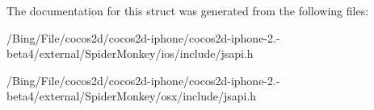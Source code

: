 The documentation for this struct was generated from the following files\-:\begin{DoxyCompactItemize}
\item 
/\-Bing/\-File/cocos2d/cocos2d-\/iphone/cocos2d-\/iphone-\/2.-\/beta4/external/\-Spider\-Monkey/ios/include/jsapi.\-h\item 
/\-Bing/\-File/cocos2d/cocos2d-\/iphone/cocos2d-\/iphone-\/2.-\/beta4/external/\-Spider\-Monkey/osx/include/jsapi.\-h\end{DoxyCompactItemize}
